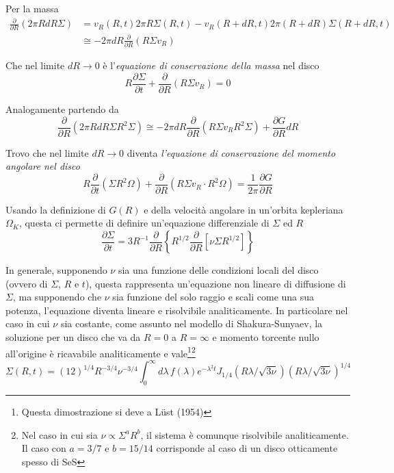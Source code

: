 \documentclass[a4paperbi]{article}
\begin{document}
	Per la massa
	\begin{align*}
		\frac{\partial}{\partial R}(2\pi RdR\Sigma)&=v_R(R,t)2\pi R\Sigma(R,t)-v_R(R+dR,t)2\pi(R+dR)\Sigma(R+dR,t)\\
		&\cong-2\pi dR\frac{\partial}{\partial R}(R\Sigma v_R)
	\end{align*}
	
	Che nel limite $dR\rightarrow 0$ è l'\textit{equazione di conservazione della massa} nel disco
	\begin{equation}
		R\frac{\partial\Sigma}{\partial t}+\frac{\partial}{\partial R}(R\Sigma v_R)=0
	\end{equation}
	
	Analogamente partendo da
	\begin{equation*}
		\frac{\partial}{\partial R}(2\pi RdR\Sigma R^2\Sigma)\cong-2\pi dR\frac{\partial}{\partial R}(R\Sigma v_R R^2\Sigma)+\frac{\partial G}{\partial R}dR	
	\end{equation*}
	
	Trovo che nel limite $dR\rightarrow 0$ diventa \textit{l'equazione di conservazione del momento angolare nel disco}
	\begin{equation}
		R\frac{\partial}{\partial t}(\Sigma R^2\Omega)+\frac{\partial}{\partial R}(R\Sigma v_R\cdot R^2\Omega)=\frac{1}{2\pi}\frac{\partial G}{\partial R}
	\end{equation}
	
	Usando la definizione di $G(R)$ e della velocità angolare in un'orbita kepleriana $\Omega_K$,  questa ci permette di definire un'equazione differenziale di $\Sigma$ ed $R$
	\begin{equation}
		\frac{\partial\Sigma}{\partial t}=3R^{-1}\frac{\partial}{\partial R}\left\{R^{1/2}\frac{\partial}{\partial R}\left[\nu\Sigma R^{1/2}\right]\right\}
	\end{equation}
	
	In generale, supponendo $\nu$ sia una funzione delle condizioni locali del disco (ovvero di $\Sigma$, $R$ e $t$), questa rappresenta un'equazione non lineare di diffusione di $\Sigma$, ma supponendo che $\nu$ sia funzione del solo raggio e scali come una sua potenza, l'equazione diventa lineare e risolvibile analiticamente. In particolare nel caso in cui $\nu$ sia costante, come assunto nel modello di Shakura-Sunyaev, la soluzione per un disco che va da $R=0$ a $R=\infty$ e momento torcente nullo all'origine è ricavabile analiticamente e vale\footnote{Questa dimostrazione si deve a Lüst (1954)}\footnote{Nel caso in cui sia $\nu\propto\Sigma^aR^b$, il sistema è comunque risolvibile analiticamente. Il caso con $a=3/7$ e $b=15/14$ corrisponde al caso di un disco otticamente spesso di SeS}
	\begin{equation*}
		\Sigma(R,t)=(12)^{1/4}R^{-3/4}\nu^{-3/4}\int^{\infty}_0d\lambda\,f(\lambda)e^{-\lambda^2t}J_{1/4}(R\lambda/\sqrt{3\nu})(R\lambda/\sqrt{3\nu})^{1/4}
	\end{equation*}
	
\end{document}
